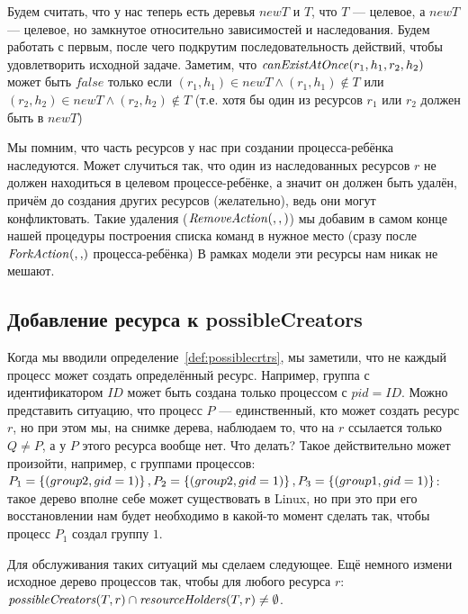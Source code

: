 Будем считать, что у нас теперь есть деревья $newT$ и $T$, что $T$ --- целевое, а $newT$ --- целевое, но замкнутое относительно зависимостей и наследования. Будем работать с первым, после чего подкрутим последовательность действий, чтобы удовлетворить исходной задаче. Заметим, что $\text{\textit{canExistAtOnce}}(r_1, h_1, r_2, h_2)$ может быть $false$ только если $(r_1, h_1) \in newT \land (r_1, h_1) \notin T$ или $(r_2, h_2) \in newT \land (r_2, h_2) \notin T$ (т.е. хотя бы один из ресурсов $r_1$ или $r_2$ должен быть в $newT$)

\begin{note}
Мы помним, что часть ресурсов у нас при создании процесса-ребёнка наследуются. Может случиться так, что один из наследованных ресурсов $r$ не должен находиться в целевом процессе-ребёнке, а значит он должен быть удалён, причём до создания других ресурсов (желательно), ведь они могут конфликтовать. Такие удаления ($\text{\textit{RemoveAction}}(, , )$) мы добавим в самом конце нашей процедуры построения списка команд в нужное место (сразу после $\crfork{}{}$ процесса-ребёнка) В рамках модели эти ресурсы нам никак не мешают.
\end{note}

\subsection{Добавление ресурса к possibleCreators}

Когда мы вводили определение~\ref{def:possiblecrtrs}, мы заметили, что не каждый процесс может создать определённый ресурс. Например, группа с идентификатором $ID$ может быть создана только процессом с $pid = ID$. Можно представить ситуацию, что процесс $P$ --- единственный, кто может создать ресурс $r$, но при этом мы, на снимке дерева, наблюдаем то, что на $r$ ссылается только $Q \neq P$, а у $P$ этого ресурса вообще нет. Что делать? Такое действительно может произойти, например, с группами процессов: $P_1 = \left\lbrace (group 2, gid=1) \right\rbrace, P_2 = \left\lbrace (group 2, gid=1) \right\rbrace, P_3 = \left\lbrace (group 1, gid=1) \right\rbrace$: такое дерево вполне себе может существовать в Linux, но при это при его восстановлении нам будет необходимо в какой-то момент сделать так, чтобы процесс $P_1$ создал группу $1$.

Для обслуживания таких ситуаций мы сделаем следующее. Ещё немного измени исходное дерево процессов так, чтобы для любого ресурса $r$: $\text{\textit{possibleCreators}}(T, r) \cap \text{\textit{resourceHolders}}(T, r) \neq \emptyset$.

